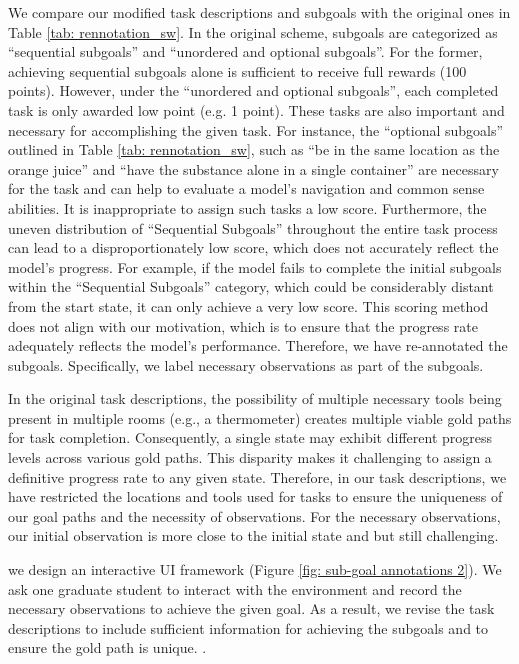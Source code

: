 We compare our modified task descriptions and subgoals with the original ones in Table \ref{tab: rennotation_sw}. In the original scheme, subgoals are categorized as ``sequential subgoals'' and ``unordered and optional subgoals''. For the former, achieving sequential subgoals alone is sufficient to receive full rewards (100 points). However, under the ``unordered and optional subgoals'', each completed task is only awarded low point (e.g. 1 point). %
These tasks are also important and necessary for accomplishing the given task. For instance, the ``optional subgoals'' outlined in Table \ref{tab: rennotation_sw}, such as ``be in the same location as the orange juice'' and ``have the substance alone in a single container'' are necessary for the task and can help to evaluate a model's navigation and common sense abilities. It is inappropriate to assign such tasks a low score. Furthermore, the uneven distribution of ``Sequential Subgoals'' throughout the entire task process can lead to a disproportionately low score, which does not accurately reflect the model's progress. For example, if the model fails to complete the initial subgoals within the ``Sequential Subgoals'' category, which could be considerably distant from the start state, it can only achieve a very low score. This scoring method does not align with our motivation, which is to ensure that the progress rate adequately reflects the model's performance. Therefore, we have re-annotated the subgoals. Specifically, we label necessary observations as part of the subgoals.

In the original task descriptions, the possibility of multiple necessary tools being present in multiple rooms (e.g., a thermometer) creates multiple viable gold paths for task completion. Consequently, a single state may exhibit different progress levels across various gold paths. This disparity makes it challenging to assign a definitive progress rate to any given state. Therefore, in our task descriptions, we have restricted the locations and tools used for tasks to ensure the uniqueness of our goal paths and the necessity of observations. For  the necessary observations, our initial observation is more close to the initial state and but still challenging.

we design an interactive UI framework (Figure \ref{fig: sub-goal annotations 2}). We ask one graduate student to interact with the environment and record the necessary observations to achieve the given goal. As a result, we revise the task descriptions to include sufficient information for achieving the subgoals and to ensure the gold path is unique. .


